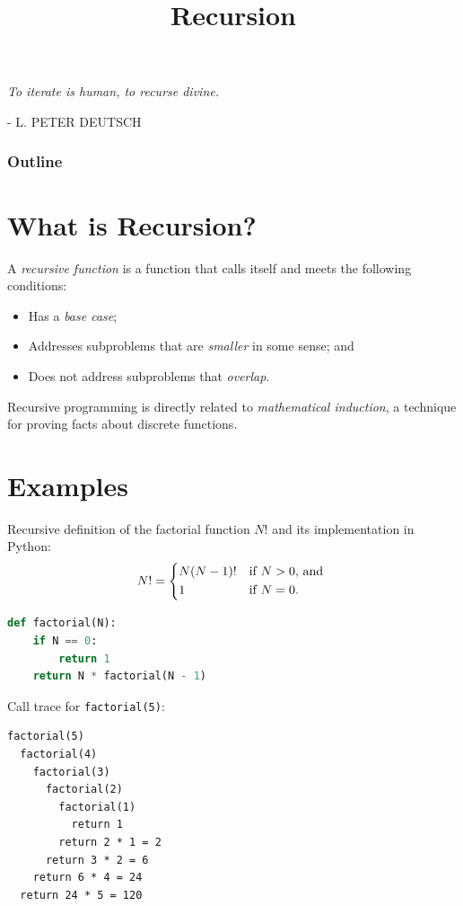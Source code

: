 \documentclass[8pt,a4paper,compress,handout]{beamer}
\title{Recursion}
\date{}
\begin{document}
\begin{frame}
\hfill
\begin{minipage}{150pt}
\begin{flushright}
\tiny \emph{To iterate is human, to recurse divine.}

\smallskip

- L. PETER DEUTSCH
\end{flushright}
\end{minipage}
\vfill
\titlepage
\end{frame}

\begin{frame}
\frametitle{Outline}
\tableofcontents
\end{frame}

\section{What is Recursion?}
\begin{frame}[fragile]
A \emph{recursive function} is a function that calls itself and meets the following conditions:
\begin{itemize}
\item Has a \emph{base case}; 
\item Addresses subproblems that are \emph{smaller} in some sense; and
\item Does not address subproblems that \emph{overlap}.
\end{itemize}

\bigskip

Recursive programming is directly related to \emph{mathematical induction}, a technique for proving facts about discrete functions.
\end{frame}

\section{Examples}
\begin{frame}[fragile]
Recursive definition of the factorial function $N!$ and its implementation in Python: 
\[
N! = \begin{dcases*}
N(N-1)! & if $N > 0$, and \\
1       & if $N=0$.
\end{dcases*}
\]

\begin{lstlisting}[language=Python]
def factorial(N):
    if N == 0:
        return 1
    return N * factorial(N - 1)
\end{lstlisting}

\bigskip

Call trace for \lstinline{factorial(5)}:
\begin{lstlisting}[language={}]
factorial(5)
  factorial(4)
    factorial(3)
      factorial(2)
        factorial(1)
          return 1
        return 2 * 1 = 2
      return 3 * 2 = 6
    return 6 * 4 = 24
  return 24 * 5 = 120
\end{lstlisting}
\end{frame}
\end{document}
